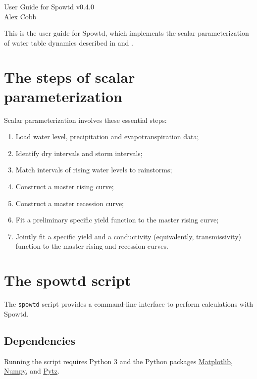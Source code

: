 \documentclass[11pt,a4paper]{article}
\begin{document}
\lstset{language=bash}

{\huge User Guide for Spowtd v0.4.0}\\[2ex]
{\large Alex Cobb}\\[0ex]

\renewcommand{\baselinestretch}{1.18}\normalsize

This is the user guide for Spowtd, which implements the scalar
parameterization of water table dynamics described in
\citet{Cobb_et_al_2017} and \citet{Cobb_and_Harvey_2019}.

\section{The steps of scalar parameterization}
Scalar parameterization involves these essential steps:
\begin{enumerate}
\item Load water level, precipitation and evapotranspiration data;
\item Identify dry intervals and storm intervals;
\item Match intervals of rising water levels to rainstorms;
\item Construct a master rising curve;
\item Construct a master recession curve;
\item Fit a preliminary specific yield function to the master rising
  curve;
\item Jointly fit a specific yield and a conductivity (equivalently,
  transmissivity) function to the master rising and recession curves.
\end{enumerate}

\section{The spowtd script}
The \texttt{spowtd} script provides a command-line interface to
perform calculations with Spowtd.

\subsection{Dependencies}
Running the script requires Python 3 and the Python packages
\href{https://matplotlib.org/}{Matplotlib},
\href{https://numpy.org/}{Numpy}, and
\href{https://pypi.org/project/pytz/}{Pytz}.
\end{document}
